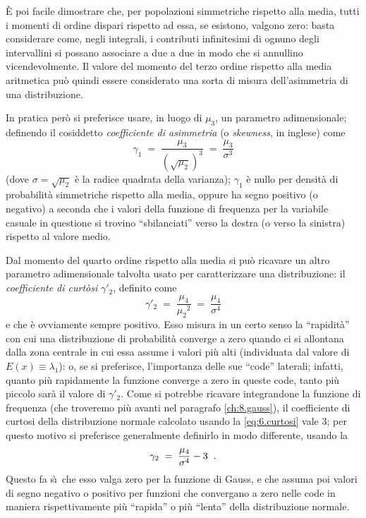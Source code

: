 \`E poi facile dimostrare che, per popolazioni simmetriche
rispetto alla media, tutti i momenti di ordine dispari
rispetto ad essa, se esistono, valgono zero: basta
considerare come, negli integrali, i contributi infinitesimi
di ognuno degli intervallini si possano associare a due a
due in modo che si annullino vicendevolmente.  Il valore del
momento del terzo ordine rispetto alla media aritmetica
pu\`o quindi essere considerato una sorta di misura
dell'asimmetria di una distribuzione.

In pratica per\`o si preferisce usare, in luogo di $\mu_3$,
un parametro adimensionale; definendo il cosiddetto
\emph{coefficiente di asimmetria}%
%
(o \emph{skewness}, in inglese) come
\begin{equation*}
  \gamma_1 \; = \; \frac{\mu_3}{\left( \sqrt{\mu_2}
    \right)^3} \; = \; \frac{\mu_3}{\sigma^3}
\end{equation*}
(dove $\sigma = \sqrt{\mu_2}$ \`e la radice quadrata della
varianza); $\gamma_1$ \`e nullo per densit\`a di
probabilit\`a simmetriche rispetto alla media, oppure ha
segno positivo (o negativo) a seconda che i valori della
funzione di frequenza per la variabile casuale in questione
si trovino ``sbilanciati'' verso la destra (o verso la
sinistra) rispetto al valore medio.

Dal momento del quarto ordine rispetto alla media si pu\`o
ricavare un altro parametro adimensionale talvolta usato per
caratterizzare una distribuzione: il
\emph{coefficiente di curt\`osi}%
%
 $\gamma'_2$, definito come
\begin{equation} \label{eq:6.curtosi}
  \gamma'_2 \; = \; \frac{\mu_4}{{\mu_2}^2} \; = \;
    \frac{\mu_4}{\sigma^4}
\end{equation}
e che \`e ovviamente sempre positivo.  Esso misura in un
certo senso la ``rapidit\`a'' con cui una distribuzione di
probabilit\`a converge a zero quando ci si allontana dalla
zona centrale in cui essa assume i valori pi\`u alti
(individuata dal valore di $E(x) \equiv \lambda_1$): o, se
si preferisce, l'importanza delle sue ``code'' laterali;
infatti, quanto pi\`u rapidamente la funzione converge a
zero in queste code, tanto pi\`u piccolo sar\`a il valore di
$\gamma'_2$.  Come si potrebbe ricavare integrandone la
funzione di frequenza (che troveremo pi\`u avanti nel
paragrafo \ref{ch:8.gauss}), il coefficiente di curtosi
della distribuzione normale calcolato usando la
\eqref{eq:6.curtosi} vale 3; per questo motivo si preferisce
generalmente definirlo in modo differente, usando la
\begin{equation*}
  \gamma_2 \; = \; \frac{\mu_4}{\sigma^4} - 3 \;\; .
\end{equation*}
Questo fa s\`\i\ che esso valga zero per la funzione di
Gauss, e che assuma poi valori di segno negativo o positivo
per funzioni che convergano a zero nelle code in maniera
rispettivamente pi\`u ``rapida'' o pi\`u ``lenta'' della
distribuzione normale.%
%

